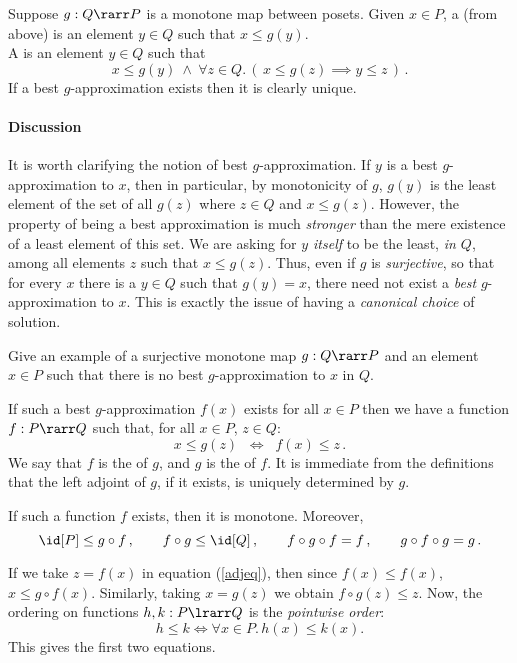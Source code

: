 \documentclass{svmult}
\begin{document}
Suppose $g : Q \rarr P$ is a monotone map between posets. Given $x \in P$,
a  (from above) is an element $y \in Q$ such that $x \leq g(y)$.\\
A  is an element $y \in Q$ such that
\[ x \leq g(y)\ \land\ \forall z \in Q.\,(\, x \leq g(z) \implies y \leq z \,)\,. \]
If a best $g$-approximation exists then it is clearly unique.

\paragraph{Discussion} It is worth clarifying the notion of best $g$-approximation. If $y$ is a best $g$-approximation to $x$, then in particular, by monotonicity of $g$, $g(y)$ is the least element of the set of all $g(z)$ where $z \in Q$ and $x \leq g(z)$. However, the property of being a best approximation is much \emph{stronger} than the mere existence of a least element of this set. We are asking for \emph{$y$ itself} to be the least, \emph{in $Q$},  among all elements $z$ such that $x \leq g(z)$. Thus, even if $g$ is \emph{surjective}, so that for every $x$ there is a $y \in Q$ such that $g(y) = x$, there need not exist a \emph{best} $g$-approximation to $x$. This is exactly the issue of having a \emph{canonical choice} of solution.
\begin{myexercise}
Give an example of a surjective monotone map $g : Q \rarr P$ and an element $x \in P$ such that there is no best $g$-approximation to $x$ in $Q$.
\end{myexercise}

\noindent If such a best $g$-approximation $f(x)$ exists for all $x \in P$ then we have a function $f : P \rarr Q$ such that, for all $x \in P$, $z \in Q$:
\begin{equation}\label{adjeq}
x \leq g(z) \;\; \Longleftrightarrow \;\; f(x) \leq z\, .
\end{equation}
We say that $f$ is the  of $g$, and $g$ is the  of $f$.
It is immediate from the definitions that the left adjoint of $g$, if it exists,  is uniquely determined by $g$.

\begin{myproposition}
If such a function $f$ exists, then it is  monotone. Moreover,
\[ \id[P]\leq g\circ f\,, \qquad f \circ g \leq \id[Q]\,, \qquad f \circ g \circ f = f\,, \qquad g \circ f \circ g = g\,. \]
\end{myproposition}
\proof  If we take $z = f(x)$ in equation (\ref{adjeq}), then since $f(x) \leq f(x)$, $x \leq g
\circ f(x)$. Similarly, taking $x = g(z)$ we obtain  $f \circ g(z) \leq z$.
Now, the ordering on functions $h, k : P \lrarr Q$  is the \emph{pointwise order}:
\[ h \leq k \iff \forall x \in P. \, h(x) \leq k(x) . \]
This gives the first two equations.
\end{document}
